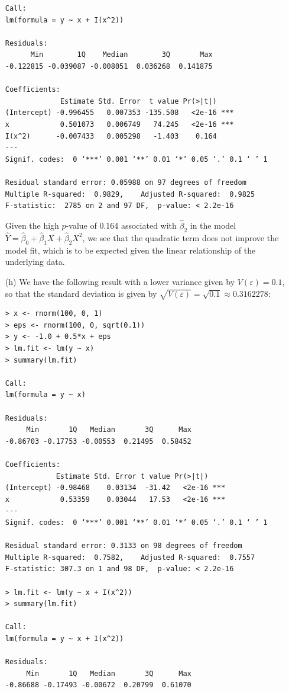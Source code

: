 \begin{itemize}
\begin{lstlisting}
Call:
lm(formula = y ~ x + I(x^2))

Residuals:
      Min        1Q    Median        3Q       Max
-0.122815 -0.039087 -0.008051  0.036268  0.141875

Coefficients:
             Estimate Std. Error  t value Pr(>|t|)
(Intercept) -0.996455   0.007353 -135.508   <2e-16 ***
x            0.501073   0.006749   74.245   <2e-16 ***
I(x^2)      -0.007433   0.005298   -1.403    0.164
---
Signif. codes:  0 ‘***’ 0.001 ‘**’ 0.01 ‘*’ 0.05 ‘.’ 0.1 ‘ ’ 1

Residual standard error: 0.05988 on 97 degrees of freedom
Multiple R-squared:  0.9829,    Adjusted R-squared:  0.9825
F-statistic:  2785 on 2 and 97 DF,  p-value: < 2.2e-16
        \end{lstlisting}
        Given the high $p$-value of 0.164 associated with $\hat{\beta}_2$
        in the model
        $\hat{Y} = \hat{\beta}_0 + \hat{\beta}_1X + \hat{\beta}_2X^2$, we
        see that the
        quadratic term does not improve the model fit, which is to be expected given
        the linear relationship of the underlying data.
    \item[(h)] We have the following result with a lower variance given by
        $V(\varepsilon) = 0.1$, so that the standard deviation is given by
        $\sqrt{V(\varepsilon)} = \sqrt{0.1} \approx 0.3162278$:
        \begin{lstlisting}
> x <- rnorm(100, 0, 1)
> eps <- rnorm(100, 0, sqrt(0.1))
> y <- -1.0 + 0.5*x + eps
> lm.fit <- lm(y ~ x)
> summary(lm.fit)

Call:
lm(formula = y ~ x)

Residuals:
     Min       1Q   Median       3Q      Max
-0.86703 -0.17753 -0.00553  0.21495  0.58452

Coefficients:
            Estimate Std. Error t value Pr(>|t|)
(Intercept) -0.98468    0.03134  -31.42   <2e-16 ***
x            0.53359    0.03044   17.53   <2e-16 ***
---
Signif. codes:  0 ‘***’ 0.001 ‘**’ 0.01 ‘*’ 0.05 ‘.’ 0.1 ‘ ’ 1

Residual standard error: 0.3133 on 98 degrees of freedom
Multiple R-squared:  0.7582,    Adjusted R-squared:  0.7557
F-statistic: 307.3 on 1 and 98 DF,  p-value: < 2.2e-16

> lm.fit <- lm(y ~ x + I(x^2))
> summary(lm.fit)

Call:
lm(formula = y ~ x + I(x^2))

Residuals:
     Min       1Q   Median       3Q      Max
-0.86688 -0.17493 -0.00672  0.20799  0.61070


\end{lstlisting}
\end{itemize}
